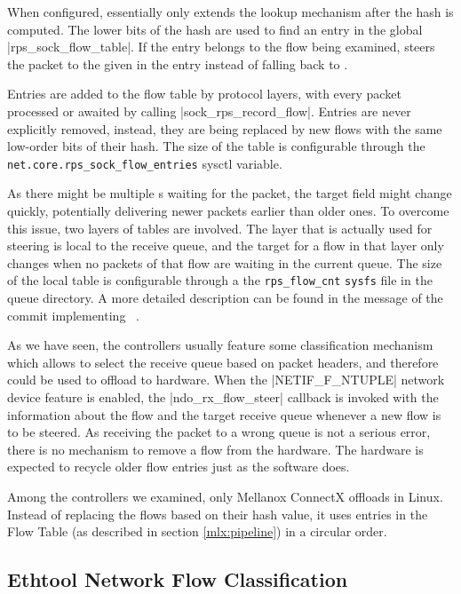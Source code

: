 When configured,  essentially only extends the lookup mechanism after
the  hash is computed. The lower bits of the hash are used to find an
entry in the global \struct|rps_sock_flow_table|. If the entry belongs to the flow
being examined,  steers the packet to the  given in the entry
instead of falling back to .

Entries are added to the flow table by protocol layers, with every packet
processed or awaited by calling \fnc|sock_rps_record_flow|.
Entries are never explicitly removed, instead, they are being replaced by new
flows with the same low-order bits of their hash. The size of the table is
configurable through the \Verb|net.core.rps_sock_flow_entries| sysctl variable.

As there might be multiple s waiting for the packet, the target 
field might change quickly, potentially delivering newer packets earlier than
older ones. To overcome this issue, two layers of tables are involved. The layer
that is actually used for steering is local to the receive queue, and the
target  for a flow in that layer only changes when no packets of that flow are
waiting in the current  queue. The size of the local table is
configurable through a the \Verb|rps_flow_cnt| \texttt{sysfs} file in the queue
directory. A more detailed description can be found in the message of the commit
implementing ~\cite{linux-rfs}.

As we have seen, the controllers usually feature some classification mechanism
which allows to select the receive queue based on packet headers, and therefore could be
used to offload  to hardware. When the \macro|NETIF_F_NTUPLE| network device feature
is enabled, the \fnc|ndo_rx_flow_steer| callback is invoked with the information
about the flow and the target receive queue whenever a new flow is to be steered.
As receiving the packet to a wrong queue is not a serious error, there is no mechanism to
remove a flow from the hardware. The hardware is expected to recycle older flow
entries just as the software does.

Among the controllers we examined, only Mellanox ConnectX offloads  in
Linux. Instead of replacing the flows based on their hash value, it uses entries in
the Flow Table (as described in section \ref{mlx:pipeline}) in a circular order.

\subsection{Ethtool Network Flow Classification}

